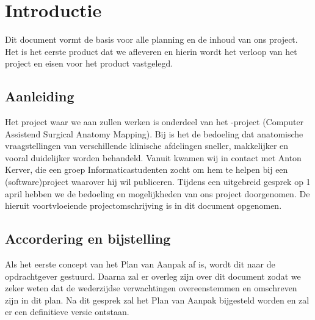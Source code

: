 \section{Introductie}

Dit document vormt de basis voor alle planning en de inhoud van ons project.
Het is het eerste product dat we afleveren en hierin wordt het verloop van het project en eisen voor het product vastgelegd.

\subsection{Aanleiding}

Het project waar we aan zullen werken is onderdeel van het \casam-project (Computer Assistend Surgical Anatomy Mapping). 
Bij \casam is het de bedoeling dat anatomische vraagstellingen van verschillende klinische afdelingen sneller, makkelijker en vooral duidelijker worden behandeld.
Vanuit \casam kwamen wij in contact met Anton Kerver, die een groep Informaticastudenten zocht om hem te helpen bij een (software)project waarover hij wil publiceren.
Tijdens een uitgebreid gesprek op 1 april hebben we de bedoeling en mogelijkheden van ons project doorgenomen.
De hieruit voortvloeiende projectomschrijving is in dit document opgenomen.

\subsection{Accordering en bijstelling}

Als het eerste concept van het Plan van Aanpak af is, wordt dit naar de opdrachtgever gestuurd.
Daarna zal er overleg zijn over dit document zodat we zeker weten dat de wederzijdse verwachtingen overeenstemmen en omschreven zijn in dit plan.
Na dit gesprek zal het Plan van Aanpak bijgesteld worden en zal er een definitieve versie ontstaan.

